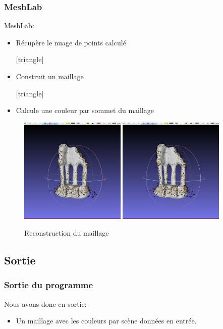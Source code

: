 	  \begin{frame}
	  \frametitle{MeshLab}
	    MeshLab:
	  \begin{itemize}
	    [triangle]
	    \item Récupère le nuage de points calculé
	    
	    [triangle]
	    \item Construit un maillage
	    
	    [triangle]
	    \item Calcule une couleur par sommet du maillage
	    \end{itemize}
	    
  \begin{figure}
  \includegraphics[width=0.45\textwidth]{Fig/nuagePtsTemple6coup.png}
  \includegraphics[width=0.45\textwidth]{Fig/nuagePtsTemple6coup.png}
  \caption{Reconstruction du maillage}
  \end{figure}
  
	 \end{frame}

	 \subsection{Sortie}
	 \begin{frame}
	  \frametitle{Sortie du programme}
	   Nous avons donc en sortie:
	  \begin{itemize}
	    [triangle]
	    \item Un maillage avec les couleurs par scène données en entrée.
	    
	    
	    \end{itemize}
	 \end{frame}
